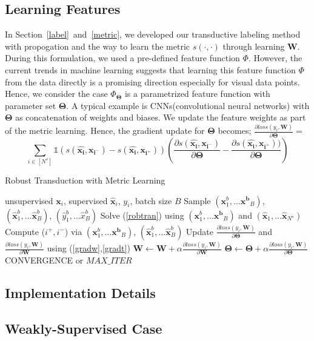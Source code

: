 \subsection{Learning Features}
In Section~\ref{label}~and~\ref{metric}, we developed our transductive labeling method with propogation and the way to learn the metric $s(\cdot,\cdot)$ through learning $\mathbf{W}$. During this formulation, we used a pre-defined feature function $\Phi$. However, the current trends in machine learning suggests that learning this feature function $\Phi$ from the data directly is a promising direction especially for visual data points. Hence, we consider the case $\Phi_{\mathbf{\Theta}}$ is a parametrized feature function with parameter set $\mathbf{\Theta}$. A typical example is CNNs(convolutional neural networks) with $\mathbf{\Theta}$ as concatenation of weights and biases. We update the feature weights as part of the metric learning. Hence, the gradient update for $\mathbf{\Theta}$ becomes; $\frac{\partial loss (y_i, \mathbf{W})}{\partial \mathbf{\Theta}} =$
\begin{equation}
 \sum_{i \in [N^s]} \mathds{1}(s(\mathbf{\hat{x_i}},\mathbf{x_{i^-}}) - s(\mathbf{\hat{x_i}},\mathbf{x_{i^+}})) \left(\frac{\partial s(\mathbf{\hat{x_i}},\mathbf{x_{i^-}}) }{\partial \mathbf{\Theta}} - \frac{\partial s(\mathbf{\hat{x_i}},\mathbf{x_{i^+}})) }{\partial \mathbf{\Theta}} \right)
 \label{gradt}
\end{equation}

\begin{algorithm}[tb]
   \caption{Robust Transduction with Metric Learning}
   \label{alg:example}
\begin{algorithmic}
    unsupervised $\mathbf{x}_i$, supervised $\mathbf{\hat{x}}_i$, $y_i$, batch size $B$
   \REPEAT
   \STATE  Sample $(\mathbf{x}^b_1,\ldots \mathbf{x^b}_B)$, $(\mathbf{\hat{x}}^b_1,\ldots \mathbf{\hat{x}}^b_B)$, $(\hat{y}^b_1,\ldots \hat{x}^b_B)$
   \STATE Solve (\ref{robtran}) using $(\mathbf{x}^b_1,\ldots \mathbf{x^b}_B)$ and  $(\mathbf{\hat{x}}_1,\ldots \mathbf{\hat{x}}_{N^s})$
   \STATE Compute ($i^+, i^-$) via $(\mathbf{x}^b_1,\ldots \mathbf{x^b}_B)$, $(\mathbf{\hat{x}}^b_1,\ldots \mathbf{\hat{x}}^b_B)$ 
   \STATE Update $\frac{\partial loss (y_i, \mathbf{W})}{\partial \mathbf{\Theta}}$ and  $\frac{\partial loss (y_i, \mathbf{W})}{\partial \mathbf{W}} $ using (\ref{gradw},\ref{gradt})
   \ENDIF
   \ENDFOR
   \STATE $\mathbf{W} \leftarrow \mathbf{W} + \alpha \frac{\partial loss (y_i, \mathbf{W})}{\partial \mathbf{W}}$ 
   \STATE $\mathbf{\Theta} \leftarrow \mathbf{\Theta} + \alpha \frac{\partial loss (y_i, \mathbf{W})}{\partial \mathbf{\Theta}}$
   \UNTIL CONVERGENCE or $MAX\_ITER$
\end{algorithmic}
\end{algorithm}

\subsection{Implementation Details}

\subsection{Weakly-Supervised Case}
